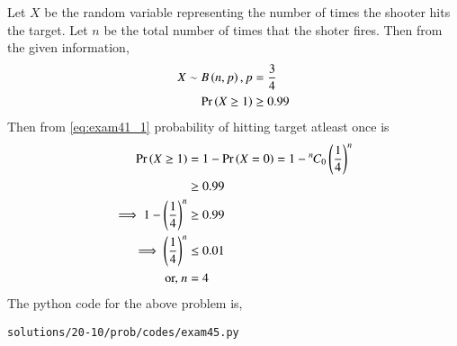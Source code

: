 Let $X$ be the random variable representing the number of times the shooter hits the target. Let $n$ be the total number of times that the shoter fires. Then from the given information, 
\begin{align}
X \sim B\left(n,p\right), p &= \frac{3}{4}
\\
\Pr\left(X \geq 1\right) &\ge 0.99
\end{align}
Then from \eqref{eq:exam41_1} probability of hitting target atleast once is
\begin{align}
\Pr\left(X \geq 1\right) &= 1-\Pr\left(X=0\right) = 1 - {{}^{n}\mkern-1muC_{0}}\left(\frac{1}{4}\right)^{n} 
\\
&\ge 0.99
\\
\implies 1-\left(\frac{1}{4}\right)^{n} &\geq 0.99
\\
\implies \left(\frac{1}{4}\right)^{n} &\leq 0.01
\\
\text{or, } n&=4
\end{align}
The python code for the above problem is,
\begin{lstlisting}
solutions/20-10/prob/codes/exam45.py
\end{lstlisting}
